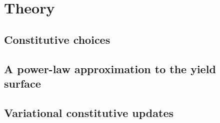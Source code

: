 \section{Theory}
\label{section: ductile/theory}

\subsection{Constitutive choices}

\subsection{A power-law approximation to the yield surface}

\subsection{Variational constitutive updates}
